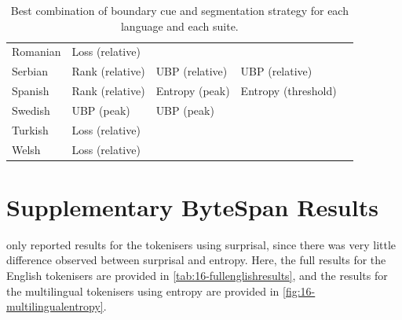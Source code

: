 \begin{table}[t]
\begin{tabular}{lllll}
    Romanian & Loss (relative) &  &  &  \\
    Serbian & Rank (relative) & UBP (relative) & UBP (relative) &  \\
    Spanish & Rank (relative) & Entropy (peak) & Entropy (threshold) &  \\
    Swedish & UBP (peak) & UBP (peak) &  &  \\
    Turkish & Loss (relative) &  &  &  \\
    Welsh & Loss (relative) &  &  &  \\
    \bottomrule
    \end{tabular}
    \caption{Best combination of boundary cue and segmentation strategy for each language and each suite.}
    \label{tab:15-bestcuesfull}
\end{table}

\section{Supplementary ByteSpan Results}
\label{app:additional_results}

 only reported results for the \tokname tokenisers using surprisal, since there was very little difference observed between surprisal and entropy. Here, the full results for the English tokenisers are provided in \cref{tab:16-fullenglishresults}, and the results for the multilingual tokenisers using entropy are provided in \cref{fig:16-multilingualentropy}.

